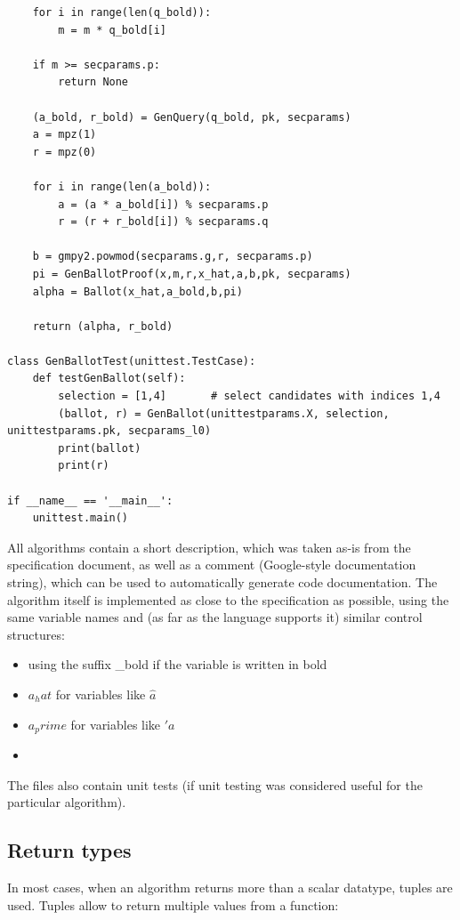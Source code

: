 \documentclass[a4paper,12pt]{report}
\begin{document}
\begin{verbatim}
    for i in range(len(q_bold)):
        m = m * q_bold[i]

    if m >= secparams.p:
        return None

    (a_bold, r_bold) = GenQuery(q_bold, pk, secparams)
    a = mpz(1)
    r = mpz(0)

    for i in range(len(a_bold)):
        a = (a * a_bold[i]) % secparams.p
        r = (r + r_bold[i]) % secparams.q

    b = gmpy2.powmod(secparams.g,r, secparams.p)
    pi = GenBallotProof(x,m,r,x_hat,a,b,pk, secparams)
    alpha = Ballot(x_hat,a_bold,b,pi)

    return (alpha, r_bold)

class GenBallotTest(unittest.TestCase):
    def testGenBallot(self):
        selection = [1,4]       # select candidates with indices 1,4
        (ballot, r) = GenBallot(unittestparams.X, selection, unittestparams.pk, secparams_l0)
        print(ballot)
        print(r)

if __name__ == '__main__':
    unittest.main()
\end{verbatim}

All algorithms contain a short description, which was taken as-is from the specification document, as well as a comment (Google-style documentation string), which can be used to automatically generate code documentation. The algorithm itself is implemented as close to the specification as possible, using the same variable names and (as far as the language supports it) similar control structures:

\begin{itemize}
	\item using the suffix \_bold if the variable is written in bold
	\item $a_hat$ for variables like $\hat{a}$
	\item $a_prime$ for variables like $\prime{a}$
	\item
\end{itemize}

The files also contain unit tests (if unit testing was considered useful for the particular algorithm).

\subsection{Return types}
In most cases, when an algorithm returns more than a scalar datatype, tuples are used. Tuples allow to return multiple values from a function:
\end{document}
